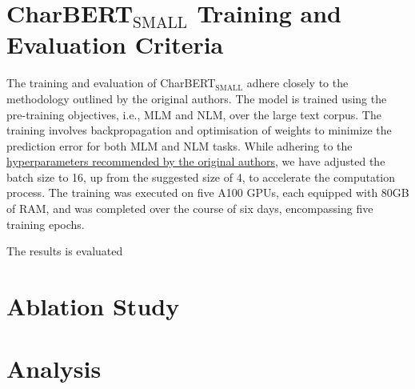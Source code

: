 \section{CharBERT$_{\text{SMALL}}$ Training and Evaluation Criteria}
\label{sec:3_charbert_training_and_evaluation_criteria}
The training and evaluation of CharBERT$_{\text{SMALL}}$ adhere closely to the methodology outlined by the original authors. The model is trained using the pre-training objectives, i.e., MLM and NLM, over the large text corpus. The training involves backpropagation and optimisation of weights to minimize the prediction error for both MLM and NLM tasks. While adhering to the \href{https://github.com/mawentao277/CharBERT/blob/main/shell/mlm.sh}{hyperparameters recommended by the original authors}, we have adjusted the batch size to 16, up from the suggested size of 4, to accelerate the computation process. The training was executed on five A100 GPUs, each equipped with 80GB of RAM, and was completed over the course of six days, encompassing five training epochs. 

The results is evaluated
\section{Ablation Study}
\label{sec:4_ablation_study}
\section{Analysis}
